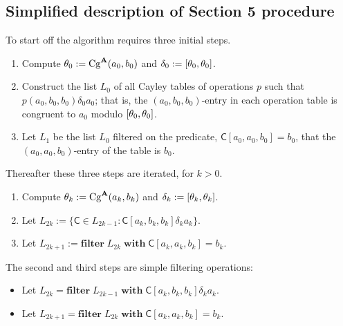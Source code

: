 \subsection{Simplified description of Section 5 procedure}
To start off the algorithm requires three initial steps.
\begin{enumerate}
  \item Compute $\theta_0 := \operatorname{Cg}^{\mathbf{A}}(a_0, b_0)$ and $\delta_0 := [\theta_0, \theta_0]$.
  \item Construct the list $L_0$ of all Cayley tables of operations $p$ 
  such that $p(a_0, b_0, b_0) \mathrel{\delta_0} a_0$; that is, the 
  $(a_0, b_0, b_0)$-entry in each operation table is congruent to $a_0$ modulo $[\theta_0, \theta_0]$.
  \item Let $L_1$ be the list $L_0$ filtered on the predicate,
  $\mathsf{C}[a_0, a_0, b_0] = b_0$, that the $(a_0, a_0, b_0)$-entry of 
  the table is $b_0$.
\end{enumerate}
Thereafter these three steps are iterated, for $k> 0$.
\begin{enumerate}
  \item Compute $\theta_{k} := \operatorname{Cg}^{\mathbf{A}}(a_k, b_k)$ and $\delta_{k} := [\theta_{k}, \theta_{k}]$.
  \item Let $L_{2k} := \{\mathsf{C} \in L_{2k-1} \colon \mathsf{C}[a_k, b_k, b_k] \mathrel{\delta_{k}} a_k \}$.
  \item Let $L_{2k+1} := \mathbf{filter} \; L_{2k} \; \mathbf{with} \; \mathsf{C}[a_k, a_k, b_k] = b_k$.
\end{enumerate}
The second and third steps are simple filtering operations:
\begin{itemize}
  \item Let $L_{2k} = \mathbf{filter}\; L_{2k-1} \; \mathbf{with} \; \mathsf{C}[a_k, b_k, b_k] \mathrel{\delta_{k}} a_k$.
  \item Let $L_{2k+1} = \mathbf{filter} \; L_{2k} \; \mathbf{with} \; \mathsf{C}[a_k, a_k, b_k] = b_k$.
\end{itemize}

